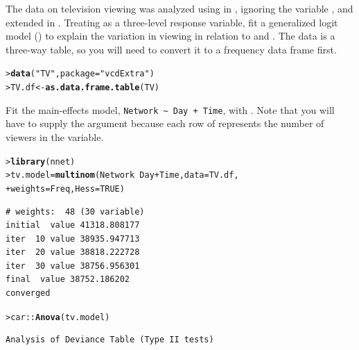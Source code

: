 \documentclass[10pt]{report}\usepackage[]{graphicx}\usepackage[]{color}
\makeatletter
\newcommand{\hlnum}[1]{\textcolor[rgb]{0.686,0.059,0.569}{#1}}%
\newcommand{\hlstr}[1]{\textcolor[rgb]{0.192,0.494,0.8}{#1}}%
\newcommand{\hlopt}[1]{\textcolor[rgb]{0,0,0}{#1}}%
\newcommand{\hlstd}[1]{\textcolor[rgb]{0.345,0.345,0.345}{#1}}%
\newcommand{\hlkwb}[1]{\textcolor[rgb]{0.69,0.353,0.396}{#1}}%
\newcommand{\hlkwc}[1]{\textcolor[rgb]{0.333,0.667,0.333}{#1}}%
\newcommand{\hlkwd}[1]{\textcolor[rgb]{0.737,0.353,0.396}{\textbf{#1}}}%
\newenvironment{kframe}{%
 \def\at@end@of@kframe{}%
 \ifinner\ifhmode%
  \def\at@end@of@kframe{\end{minipage}}%
  \begin{minipage}{\columnwidth}%
 \fi\fi%
 \def\FrameCommand##1{\hskip\@totalleftmargin \hskip-\fboxsep
 \colorbox{shadecolor}{##1}\hskip-\fboxsep
     \hskip-\linewidth \hskip-\@totalleftmargin \hskip\columnwidth}%
 \MakeFramed {\advance\hsize-\width
   \@totalleftmargin\z@ \linewidth\hsize
   \@setminipage}}%
 {\par\unskip\endMakeFramed%
 \at@end@of@kframe}
\newenvironment{knitrout}{}{} %
\renewenvironment{knitrout}{\small\renewcommand{\baselinestretch}{.85}}{} %
\makeatother
\begin{document}
\begin{Exercises}
\exercise The data  on television viewing was analyzed using \ca in , ignoring the variable
  , and extended in .  Treating  as a three-level response variable,
  fit a generalized logit model () to  explain the variation in viewing in relation to  and .
  The  data is a three-way table, so you will need to convert it to a frequency data frame first.
\begin{knitrout}\footnotesize
{}\color{fgcolor}\begin{kframe}
\begin{alltt}
\hlstd{> }\hlkwd{data}\hlstd{(}\hlstr{"TV"}\hlstd{,} \hlkwc{package}\hlstd{=}\hlstr{"vcdExtra"}\hlstd{)}
\hlstd{> }\hlstd{TV.df} \hlkwb{<-} \hlkwd{as.data.frame.table}\hlstd{(TV)}
\end{alltt}
\end{kframe}
\end{knitrout}
  \begin{enumerate*}
    \item Fit the main-effects model, \verb|Network ~ Day + Time|, with .  Note that you will have to
    supply the  argument because each row of  represents the number of viewers in the
     variable.
    \begin{ans}
\begin{knitrout}\footnotesize
{}\color{fgcolor}\begin{kframe}
\begin{alltt}
\hlstd{> }\hlkwd{library}\hlstd{(nnet)}
\hlstd{> }\hlstd{tv.model} \hlkwb{=} \hlkwd{multinom}\hlstd{(Network} \hlopt{~} \hlstd{Day} \hlopt{+} \hlstd{Time,} \hlkwc{data} \hlstd{= TV.df,}
\hlstd{+ }                    \hlkwc{weights} \hlstd{= Freq,} \hlkwc{Hess} \hlstd{=} \hlnum{TRUE}\hlstd{)}
\end{alltt}
\begin{verbatim}
# weights:  48 (30 variable)
initial  value 41318.808177 
iter  10 value 38935.947713
iter  20 value 38818.222728
iter  30 value 38756.956301
final  value 38752.186202 
converged
\end{verbatim}
\begin{alltt}
\hlstd{> }\hlstd{car}\hlopt{::}\hlkwd{Anova}\hlstd{(tv.model)}
\end{alltt}
\begin{verbatim}
Analysis of Deviance Table (Type II tests)


\end{verbatim}
\end{kframe}
\end{knitrout}
\end{ans}
\end{enumerate*}
\end{Exercises}
\end{document}
